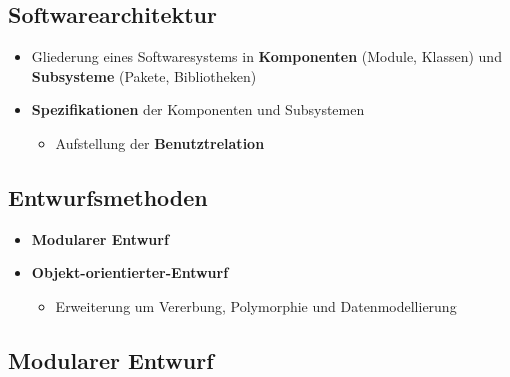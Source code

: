 \documentclass[parskip=full, 12pt]{scrartcl}
\begin{document}
		\subsection{Softwarearchitektur}
		
			\begin{itemize}
				\item Gliederung eines Softwaresystems in \textbf{Komponenten} (Module, Klassen) und \textbf{Subsysteme} (Pakete, Bibliotheken)
				\item \textbf{Spezifikationen} der Komponenten und Subsystemen
				\begin{itemize}
					\item Aufstellung der \textbf{Benutztrelation}
				\end{itemize}
			\end{itemize}
	
		\subsection{Entwurfsmethoden}
		
			\begin{itemize}
				\item \textbf{Modularer Entwurf}
				\item \textbf{Objekt-orientierter-Entwurf}
				\begin{itemize}
					\item Erweiterung um Vererbung, Polymorphie und Datenmodellierung
				\end{itemize}
			\end{itemize}
	
		\subsection{Modularer Entwurf}
		
\end{document}

